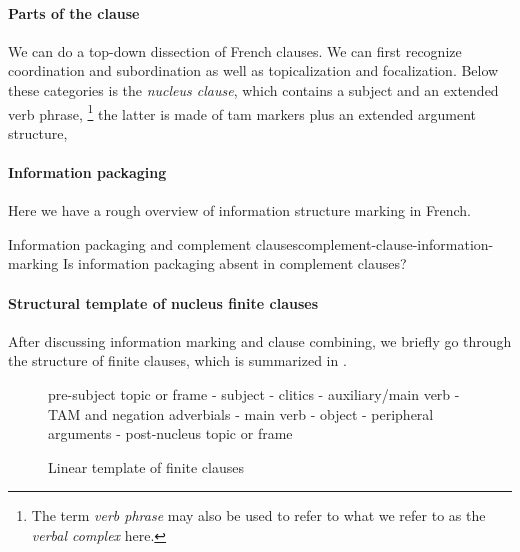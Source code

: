 \documentclass[a4paper, oneside, 12pt]{report}
\newcommand*{\term}[1]{\emph{#1}}
\begin{document}
\paragraph*{Parts of the clause}
We can do a top-down dissection of French clauses.
We can first recognize coordination and subordination
as well as topicalization and focalization.
Below these categories is the \term{nucleus clause},
which contains a subject and an extended verb phrase,%
\footnote{
    The term \term{verb phrase} may also be used to refer to what we refer to as the \term{verbal complex} here.
}
the latter is made of \ac{tam} markers plus an extended argument structure,

\paragraph*{Information packaging}
Here we have a rough overview of information structure marking in French.

\begin{todobox}{Information packaging and complement clauses}{complement-clause-information-marking}
    Is information packaging absent in complement clauses?
\end{todobox}

\paragraph*{Structural template of nucleus finite clauses}
After discussing information marking and clause combining,
we briefly go through the structure of finite clauses,
which is summarized in .

\begin{figure}[H]
    \caption{Linear template of finite clauses}
    \label{fig:finite-clause-template}
    \centering
    pre-subject topic or frame - subject - clitics - auxiliary/main verb - TAM and negation adverbials - main verb - object - peripheral arguments - post-nucleus topic or frame
\end{figure}
\end{document}
